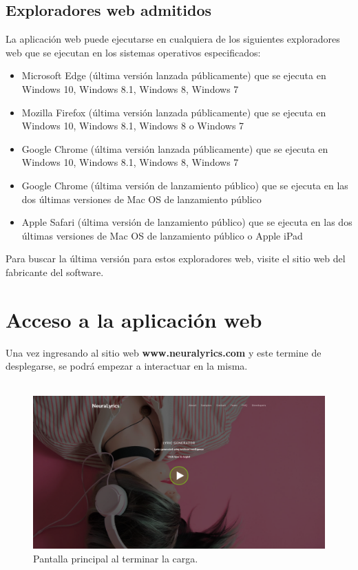 \documentclass[12pt, a4paper, titlepage]{article}
\begin{document}
		\subsection{Exploradores web admitidos}
			La aplicación web puede ejecutarse en cualquiera de los siguientes
			exploradores web que se ejecutan en los sistemas operativos especificados:
			\begin{itemize}
			\item Microsoft Edge (última versión lanzada públicamente) que se ejecuta en Windows 10, Windows 8.1, Windows 8, Windows 7
			\item Mozilla Firefox (última versión lanzada públicamente) que se ejecuta en Windows 10, Windows 8.1, Windows 8 o Windows 7
			\item Google Chrome (última versión lanzada públicamente) que se ejecuta en Windows 10, Windows 8.1, Windows 8, Windows 7
			\item Google Chrome (última versión de lanzamiento público) que se ejecuta en las dos últimas versiones de Mac OS de lanzamiento público
			\item Apple Safari (última versión de lanzamiento público) que se ejecuta en las dos últimas versiones de Mac OS de lanzamiento público o Apple iPad
			\end{itemize}
			
			Para buscar la última versión para estos exploradores web,
			visite el sitio web del fabricante del software.
	
	\newpage
	
	\section{Acceso a la aplicación web}
	Una vez ingresando al sitio web \textbf{www.neuralyrics.com} y este termine
	de desplegarse, se podrá empezar a interactuar en la misma.\\\\
		\begin{figure}[H]
		\includegraphics[width=13.5cm]{./Imagenes/Capturas/pprincipal.png}
		\centering \caption{Pantalla principal al terminar la carga.}
	\end{figure}
\end{document}
